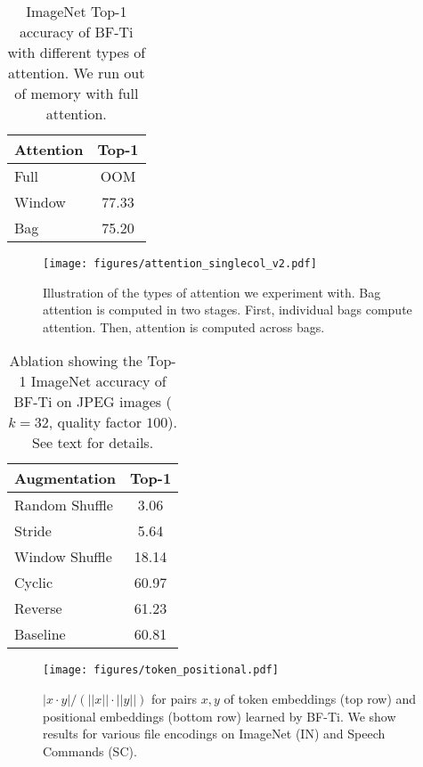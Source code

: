 \begin{table}
\centering
\begin{tabular}{ lc }
\toprule[1.5pt]
  \textbf{Attention} & \textbf{Top-1} \\ \midrule[1.25pt]
  Full & OOM \\
  Window & 77.33 \\
  Bag & 75.20 \\
  \bottomrule[1.5pt]
\end{tabular}
\caption{
ImageNet Top-1 accuracy of BF-Ti with different types of attention. We run out of memory with full attention.}
\label{table:attention}
\end{table}

\begin{figure}
    \centering
    \texttt{[image: figures/attention\_singlecol\_v2.pdf]}
    \caption{
    Illustration of the types of attention we experiment with. Bag attention is computed in two stages. First, individual bags compute attention. Then, attention is computed across bags.
    }
    \label{fig:attention}
\end{figure}

\begin{table}
\centering
\begin{tabular}{ lc }
\toprule[1.5pt]
  \textbf{Augmentation} & \textbf{Top-1} \\ 
  \midrule[1.25pt]
  Random Shuffle & 3.06 \\
  Stride & 5.64 \\
  Window Shuffle & 18.14 \\
  Cyclic & 60.97 \\
  Reverse & 61.23 \\
  Baseline & 60.81 \\ 
  \bottomrule[1.5pt]
\end{tabular}
\caption{
  Ablation showing the Top-1 ImageNet accuracy of BF-Ti on JPEG images ($k=32$, quality factor $100$). See text for details.
}
\label{table:ablation}
\end{table}

\begin{figure*}[t!]
    \centering
    \texttt{[image: figures/token\_positional.pdf]}
    \caption{
    $|x \cdot y| / (||x|| \cdot ||y||)$ for pairs $x, y$ of token embeddings (top row) and positional embeddings (bottom row) learned by BF-Ti. We show results for various file encodings on ImageNet (IN) and Speech Commands (SC).
    }
    \label{fig:embeddings}
\end{figure*}

